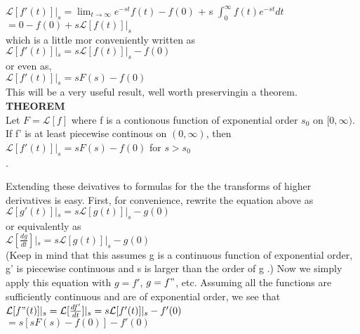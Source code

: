 \documentclass[12pt]{article}
\begin{document}
{$\mathcal{L}[f'(t)]|_s = \lim_{t \to \infty} e^{-st} f(t) - f(0)$ + s \(\int_{0}^{\infty} f(t)e^{-st}dt\)\\

$= 0 - f(0) + s\mathcal{L}[f(t)]|_s$\\

which is a little mor conveniently written as\\

$\mathcal{L}[f'(t)]|_s = s\mathcal{L}[f(t)]|_s - f(0)$\\

or even as,\\

$\mathcal{L}[f'(t)]|_s = sF(s) - f(0)$\\

This will be a very useful result, well worth preservingin a theorem.\\

 \textbf{THEOREM}\\
Let $F = \mathcal{L}[f]$ where f is a contionous function of exponential order $s_0$ on $[0, \infty)$. If f' is at least piecewise continous on $(0, \infty)$, then\\

$\mathcal{L}[f'(t)]|_s = sF(s) - f(0)$		for $s>s_0$\\.

Extending these deivatives to formulas for the the transforms of higher derivatives is easy. First, for convenience, rewrite the equation above as\\

$\mathcal{L}[g'(t)]|_s = s\mathcal{L}[g(t)]|_s - g(0)$\\

or equivalently as\\

$\mathcal{L}[\frac{dg}{dt}]|_s = s\mathcal{L}[g(t)]|_s - g(0)$\\

(Keep in mind that this assumes g is a continuous function of exponential order, g' is piecewise continuous and s is larger than the order of g .) Now we simply apply this equation with $g = f'$, $g = f"$, etc. Assuming all the functions are sufficiently continuous and are of exponential order,
we see that\\

$\mathcal{L}[f"(t)]|_s = \mathcal{L}[\frac{df'}{dt}]|_s = s\mathcal{L}[f'(t)]|_s - f'(0)$\\

$= s[sF(s) - f(0)] - f'(0)$\\

}
\end{document}
